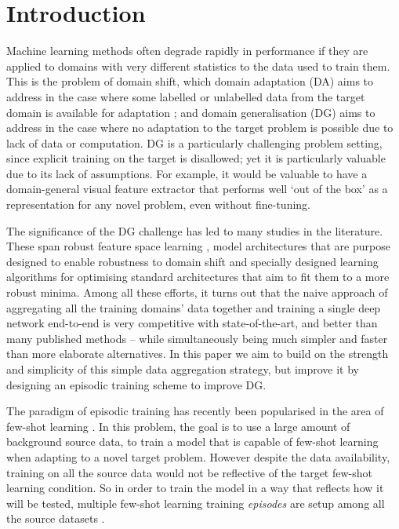 \documentclass[10pt,twocolumn,letterpaper]{article}
\begin{document}
\section{Introduction}

 Machine learning methods often degrade rapidly in performance if they are applied to domains with very different statistics to the data used to train them. This is the problem of domain shift, which domain adaptation (DA) aims to address in the case where some labelled or unlabelled data from the target domain is available for adaptation \cite{shai2006nipsdomainadaptation,tzeng2014deep,long2015learning,ganin2015unsupervised,mslongnips2016,bousmalis2016domain}; and domain generalisation (DG) aims to address in the case where no adaptation to the target problem is possible \cite{muandet2013domaingeneralization,Ghifary2015mtae,Li2018MLDG,shankar2018generalizing} due to lack of data or computation. DG is a particularly challenging problem setting, since explicit training on the target is disallowed; yet it is particularly valuable due to its lack of assumptions. For example, it would be valuable to have a domain-general visual feature extractor that performs well `out of the box' as a representation for any novel problem, even without fine-tuning.



The significance of the DG challenge has led to many studies in the literature. These span robust feature space learning \cite{muandet2013domaingeneralization,Ghifary2015mtae}, model architectures that are purpose designed to enable robustness to domain shift \cite{Khosla12undobias,Xu2014lre,Li2017dg} and specially designed learning algorithms for optimising standard architectures \cite{shankar2018generalizing,Li2018MLDG} that aim to fit them to a more robust minima. Among all these efforts, it turns out  that the naive approach \cite{Li2017dg} of aggregating all the training domains' data together and training a single deep network end-to-end is very competitive with state-of-the-art, and better than many published methods -- while simultaneously being much simpler and faster than more elaborate alternatives. In this paper we aim to build on the strength and simplicity of this simple data aggregation strategy, but improve it by designing an episodic training scheme to improve DG.

The paradigm of episodic training  has recently been popularised in the area of few-shot learning \cite{finn2017model,ravi2016optimization,snell2017prototypicalNets}. In this problem, the goal is to use a large amount of background source data, to train a model that is capable of few-shot learning when adapting to a novel target problem. However despite the data availability, training on all the source data would not be reflective of the target few-shot learning condition. So in order to train the model in a way that reflects how it will be tested, multiple few-shot learning training \emph{episodes} are setup among all the source datasets \cite{finn2017model,ravi2016optimization,snell2017prototypicalNets}. 
\end{document}
